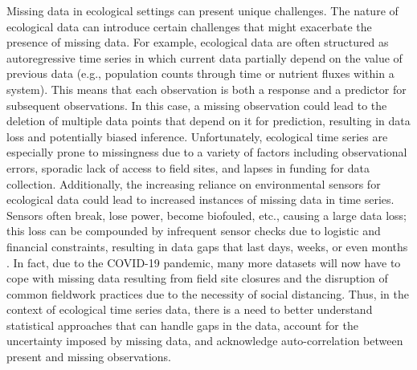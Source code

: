 \documentclass{article}
\begin{document}

Missing data in ecological settings can present unique challenges.
The nature of ecological data can introduce certain challenges that might exacerbate the presence of missing data. For example, ecological data are often structured as autoregressive time series in which current data partially depend on the value of previous data (e.g., population counts through time or nutrient fluxes within a system). This means that each observation is both a response and a predictor for subsequent observations. In this case, a missing observation could lead to the deletion of multiple data points that depend on it for prediction, resulting in data loss and potentially biased inference. Unfortunately, ecological time series are especially prone to missingness due to a variety of factors including observational errors, sporadic lack of access to field sites, and lapses in funding for data collection. Additionally, the increasing reliance on environmental sensors for ecological data \citep{porter_new_2009} could lead to increased instances of missing data in time series. Sensors often break, lose power, become biofouled, etc., causing a large data loss; this loss can be compounded by infrequent sensor checks due to logistic and financial constraints, resulting in data gaps that last days, weeks, or even months \citep{hossie_confronting_2021}. In fact, due to the COVID-19 pandemic, many more datasets will now have to cope with missing data resulting from field site closures and the disruption of common fieldwork practices due to the necessity of social distancing. Thus, in the context of ecological time series data, there is a need to better understand statistical approaches that can handle gaps in the data, account for the uncertainty imposed by missing data, and acknowledge auto-correlation between present and missing observations. 
\end{document}

